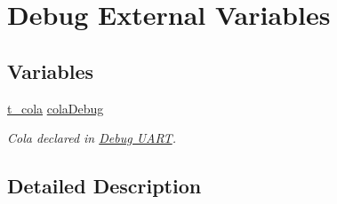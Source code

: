 \hypertarget{group___debug___external___variables}{}\section{Debug External Variables}
\label{group___debug___external___variables}
\subsection*{Variables}
\begin{DoxyCompactItemize}
\item 
\hyperlink{structt__cola}{t\+\_\+cola} \hyperlink{group___debug___external___variables_ga314fd637d927bd6a2551e119de623aa5}{cola\+Debug}\hypertarget{group___debug___external___variables_ga314fd637d927bd6a2551e119de623aa5}{}\label{group___debug___external___variables_ga314fd637d927bd6a2551e119de623aa5}

\begin{DoxyCompactList}\small\item\em Cola declared in \hyperlink{group___debug___uart}{Debug U\+A\+RT}. \end{DoxyCompactList}\end{DoxyCompactItemize}


\subsection{Detailed Description}
